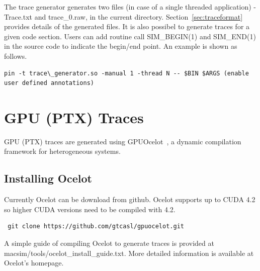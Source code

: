 The trace generator generates two files (in case of a single threaded
application) - Trace.txt and trace\_0.raw, in the current directory.
Section~\ref{sec:traceformat} provides details of the generated files.
It is also possibel to generate traces for a given code section.
Users can add routine call SIM\_BEGIN(1) and SIM\_END(1) in the 
source code to indicate the begin/end point. An example is shown as
follows.

\begin{Verbatim}
pin -t trace\_generator.so -manual 1 -thread N -- $BIN $ARGS (enable user defined annotations) 
\end{Verbatim}

\section{GPU (PTX) Traces}
\label{sec:gpu_traces}

GPU (PTX) traces are generated using GPUOcelot~\cite{ocelot}, a dynamic compilation
framework for heterogeneous systems. 


\subsection{Installing Ocelot}

Currently Ocelot can be download from github. Ocelot supports up to
CUDA 4.2 so higher CUDA versions need to be compiled with 4.2. 

\begin{Verbatim}
 git clone https://github.com/gtcasl/gpuocelot.git
\end{Verbatim}

A simple guide of compiling Ocelot to generate traces is provided 
at macsim/tools/ocelot\_install\_guide.txt. 
More detailed information is available at Ocelot's homepage. 



